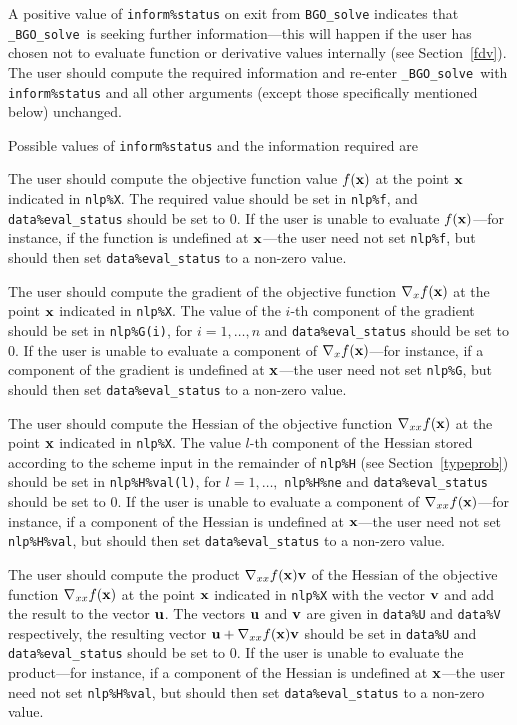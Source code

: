 \documentclass{galahad}
\newcommand{\packagename}{BGO}
\newcommand{\fullpackagename}{\libraryname\_\packagename}
\newcommand{\solver}{{\tt \fullpackagename\_solve}}
\begin{document}
A positive value of {\tt inform\%status} on exit from
{\tt \packagename\_solve}
indicates that
\solver\ is seeking further information---this will happen
if the user has chosen not to evaluate function or
derivative values internally (see Section~\ref{fdv}).
The user should compute the required information and re-enter \solver\
with {\tt inform\%status} and all other arguments (except those specifically
mentioned below) unchanged.

Possible values of {\tt inform\%status} and the information required are
\begin{description}
 The user should compute the objective function
     value $f({\mathbf{x}})$ at the point ${\mathbf{x}}$ indicated in {\tt nlp\%X}.
     The required value should be set in {\tt nlp\%f}, and
     {\tt data\%eval\_status} should be set to 0. If the user is
     unable to evaluate $f({\mathbf{x}})$---for instance, if the function is
     undefined at ${\mathbf{x}}$---the user need not set {\tt nlp\%f}, but
     should then set {\tt data\%eval\_status} to a non-zero value.

 The user should compute the gradient
     of the objective function $\nabla_x f({\mathbf{x}})$ at the point ${\mathbf{x}}$
     indicated in {\tt nlp\%X}.
     The value of the $i$-th component of the gradient should be set
     in {\tt nlp\%G(i)},      for $i = 1, \ldots, n$ and
     {\tt data\%eval\_status} should be set to 0. If the user is
     unable to evaluate a component of $\nabla_x f({\mathbf{x}})$---for instance,
     if a component of the gradient is
     undefined at ${\mathbf{x}}$---the user need not set {\tt nlp\%G}, but
     should then set {\tt data\%eval\_status} to a non-zero value.

 The user should compute the Hessian
     of the objective function $\nabla_{xx} f({\mathbf{x}})$ at the point ${\mathbf{x}}$
     indicated in {\tt nlp\%X}.
     The value $l$-th component of the Hessian stored according to the
     scheme input in the remainder of {\tt nlp\%H} (see Section~\ref{typeprob})
     should be set in {\tt nlp\%H\%val(l)},
     for $l = 1, \ldots,$ {\tt  nlp\%H\%ne} and
     {\tt data\%eval\_status} should be set to 0. If the user is
     unable to evaluate a component of $\nabla_{xx} f({\mathbf{x}})$---for instance,
     if a component of the Hessian is
     undefined at ${\mathbf{x}}$---the user need not set {\tt nlp\%H\%val}, but
     should then set {\tt data\%eval\_status} to a non-zero value.

 The user should compute the product
     $\nabla_{xx} f({\mathbf{x}}){\mathbf{v}}$ of the Hessian
     of the objective function $\nabla_{xx} f({\mathbf{x}})$ at the point ${\mathbf{x}}$
     indicated in {\tt nlp\%X} with the vector ${\mathbf{v}}$ and add the result to
     the vector ${\mathbf{u}}$. The vectors ${\mathbf{u}}$ and ${\mathbf{v}}$ are given in
     {\tt data\%U} and {\tt data\%V} respectively, the resulting
     vector ${\mathbf{u}} + \nabla_{xx} f({\mathbf{x}}){\mathbf{v}}$ should be set in {\tt data\%U}
     and  {\tt data\%eval\_status} should be set to 0. If the user is
     unable to evaluate the product---for instance,
     if a component of the Hessian is
     undefined at ${\mathbf{x}}$---the user need not set {\tt nlp\%H\%val}, but
     should then set {\tt data\%eval\_status} to a non-zero value.


\end{description}
\end{document}
